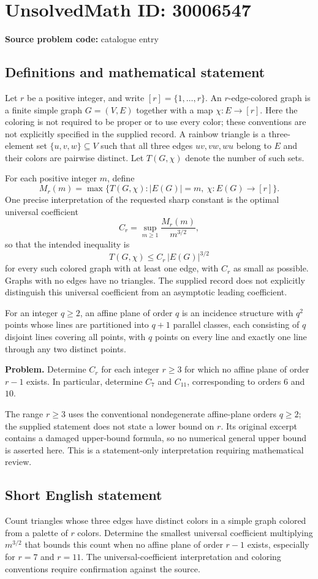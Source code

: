 \documentclass[11pt]{article}
\begin{document}
\section*{UnsolvedMath ID: 30006547}
\textbf{Source problem code:} catalogue entry
\subsection{Definitions and mathematical statement}
Let \(r\) be a positive integer, and write \([r]=\{1,\ldots,r\}\). An \(r\)-edge-colored graph is a finite simple graph \(G=(V,E)\) together with a map \(\chi:E\to[r]\). Here the coloring is not required to be proper or to use every color; these conventions are not explicitly specified in the supplied record. A rainbow triangle is a three-element set \(\{u,v,w\}\subseteq V\) such that all three edges \(uv,vw,wu\) belong to \(E\) and their colors are pairwise distinct. Let \(T(G,\chi)\) denote the number of such sets.

For each positive integer \(m\), define
\[
M_r(m)=\max\bigl\{T(G,\chi): |E(G)|=m,\ \chi:E(G)\to[r]\bigr\}.
\]
One precise interpretation of the requested sharp constant is the optimal universal coefficient
\[
C_r=\sup_{m\geq1}\frac{M_r(m)}{m^{3/2}},
\]
so that the intended inequality is
\[
T(G,\chi)\leq C_r\,|E(G)|^{3/2}
\]
for every such colored graph with at least one edge, with \(C_r\) as small as possible. Graphs with no edges have no triangles. The supplied record does not explicitly distinguish this universal coefficient from an asymptotic leading coefficient.

For an integer \(q\geq2\), an affine plane of order \(q\) is an incidence structure with \(q^2\) points whose lines are partitioned into \(q+1\) parallel classes, each consisting of \(q\) disjoint lines covering all points, with \(q\) points on every line and exactly one line through any two distinct points.

\textbf{Problem.} Determine \(C_r\) for each integer \(r\geq3\) for which no affine plane of order \(r-1\) exists. In particular, determine \(C_7\) and \(C_{11}\), corresponding to orders \(6\) and \(10\).

The range \(r\geq3\) uses the conventional nondegenerate affine-plane orders \(q\geq2\); the supplied statement does not state a lower bound on \(r\). Its original excerpt contains a damaged upper-bound formula, so no numerical general upper bound is asserted here. This is a statement-only interpretation requiring mathematical review.
\subsection{Short English statement}
Count triangles whose three edges have distinct colors in a simple graph colored from a palette of \(r\) colors. Determine the smallest universal coefficient multiplying \(m^{3/2}\) that bounds this count when no affine plane of order \(r-1\) exists, especially for \(r=7\) and \(r=11\). The universal-coefficient interpretation and coloring conventions require confirmation against the source.
\end{document}
